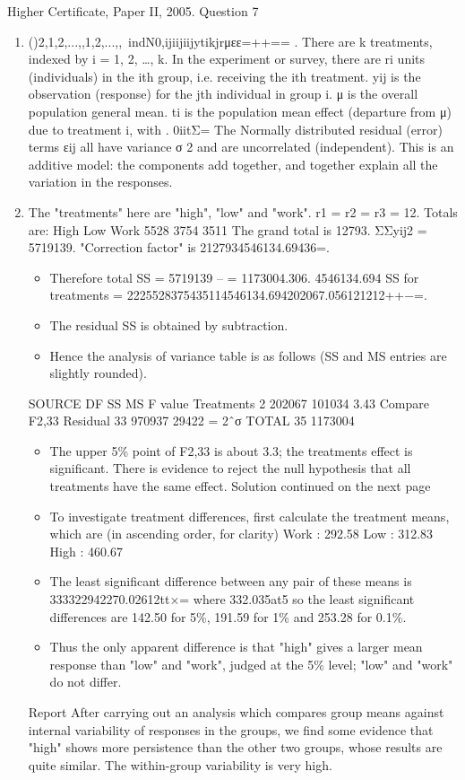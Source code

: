 \documentclass[a4paper,12pt]{article}
\begin{document}
Higher Certificate, Paper II, 2005. Question 7
\begin{enumerate}
\item {}()2,1,2,...,,1,2,...,,~indN0,ijiijiijytikjrμεε=++== .
There are k treatments, indexed by i = 1, 2, …, k. In the experiment or survey, there are ri units (individuals) in the ith group, i.e. receiving the ith treatment. yij is the observation (response) for the jth individual in group i.
μ is the overall population general mean. ti is the population mean effect (departure from μ) due to treatment i, with . 0iitΣ=
The Normally distributed residual (error) terms εij all have variance σ 2 and are uncorrelated (independent).
This is an additive model: the components add together, and together explain all the variation in the responses.
\item The "treatments" here are "high", "low" and "work". r1 = r2 = r3 = 12.
Totals are:
High
Low
Work
5528
3754
3511
The grand total is 12793. ΣΣyij2 = 5719139.
"Correction factor" is 2127934546134.69436=.
\begin{itemize}
    \item Therefore total SS = 5719139 – = 1173004.306. 4546134.694
SS for treatments = 2225528375435114546134.694202067.056121212++−=.
    \item The residual SS is obtained by subtraction.
    \item Hence the analysis of variance table is as follows (SS and MS entries are slightly rounded).
\end{itemize}

SOURCE
DF
SS
MS
F value
Treatments
2
202067
101034
3.43 Compare F2,33
Residual
33
970937
29422
= 2ˆσ
TOTAL
35
1173004
\begin{itemize}
\item The upper 5\% point of F2,33 is about 3.3; the treatments effect is significant. There is evidence to reject the null hypothesis that all treatments have the same effect.
Solution continued on the next page
\item To investigate treatment differences, first calculate the treatment means, which are (in ascending order, for clarity)
Work : 292.58 Low : 312.83 High : 460.67
\item The least significant difference between any pair of these means is
333322942270.02612tt×= where 332.035at5%
so the least significant differences are 142.50 for 5\%, 191.59 for 1\% and 253.28 for 0.1\%. 
\item Thus the only apparent difference is that "high" gives a larger mean response than "low" and "work", judged at the 5\% level; "low" and "work" do not differ.
\end{itemize}

\begin{framed}
Report
After carrying out an analysis which compares group means against internal variability of responses in the groups, we find some evidence that "high" shows more persistence than the other two groups, whose results are quite similar. The within-group variability is very high.
\end{framed}
\end{enumerate}
\end{document}
